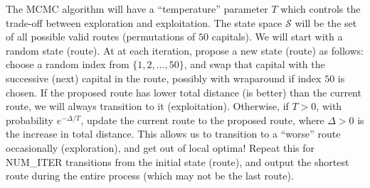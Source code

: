 \documentclass[12pt]{article}
\renewcommand{\|}{\mid}
\begin{document}
\begin{enumerate}
The MCMC algorithm will have a ``temperature'' parameter $T$ which controls the trade-off between exploration and exploitation. The state space $\mathcal{S}$ will be the set of all possible valid routes (permutations of $50$ capitals). We will start with a random state (route). At at each iteration, propose a new state (route) as follows: choose a random index from $\{1,2,\dots,50\}$, and swap that capital with the successive (next) capital in the route, possibly with wraparound if index $50$ is chosen. If the proposed route has lower total distance (is better) than the current route, we will always transition to it (exploitation). Otherwise, if $T>0$, with probability $e^{-\Delta/T}$, update the current route to the proposed route, where $\Delta>0$ is the increase in total distance. This allows us to transition to a ``worse'' route occasionally (exploration), and get out of local optima! Repeat this for NUM\_ITER transitions from the initial state (route), and output the shortest route during the entire process (which may not be the last route). 




\end{enumerate}
\end{document}
